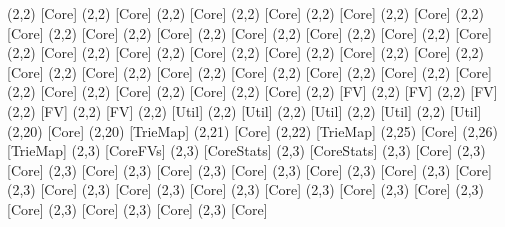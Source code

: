 {(2,2) [Core] %
(2,2) [Core] %
(2,2) [Core] %
(2,2) [Core] %
(2,2) [Core] %
(2,2) [Core] %
(2,2) [Core] %
(2,2) [Core] %
(2,2) [Core] %
(2,2) [Core] %
(2,2) [Core] %
(2,2) [Core] %
(2,2) [Core] %
(2,2) [Core] %
(2,2) [Core] %
(2,2) [Core] %
(2,2) [Core] %
(2,2) [Core] %
(2,2) [Core] %
(2,2) [Core] %
(2,2) [Core] %
(2,2) [Core] %
(2,2) [Core] %
(2,2) [Core] %
(2,2) [Core] %
(2,2) [Core] %
(2,2) [Core] %
(2,2) [Core] %
(2,2) [Core] %
(2,2) [Core] %
(2,2) [FV] %
(2,2) [FV] %
(2,2) [FV] %
(2,2) [FV] %
(2,2) [FV] %
(2,2) [Util] %
(2,2) [Util] %
(2,2) [Util] %
(2,2) [Util] %
(2,2) [Util] %
(2,20) [Core] %
(2,20) [TrieMap] %
(2,21) [Core] %
(2,22) [TrieMap] %
(2,25) [Core] %
(2,26) [TrieMap] %
(2,3) [CoreFVs] %
(2,3) [CoreStats] %
(2,3) [CoreStats] %
(2,3) [Core] %
(2,3) [Core] %
(2,3) [Core] %
(2,3) [Core] %
(2,3) [Core] %
(2,3) [Core] %
(2,3) [Core] %
(2,3) [Core] %
(2,3) [Core] %
(2,3) [Core] %
(2,3) [Core] %
(2,3) [Core] %
(2,3) [Core] %
(2,3) [Core] %
(2,3) [Core] %
(2,3) [Core] %
(2,3) [Core] %
(2,3) [Core] %
}
